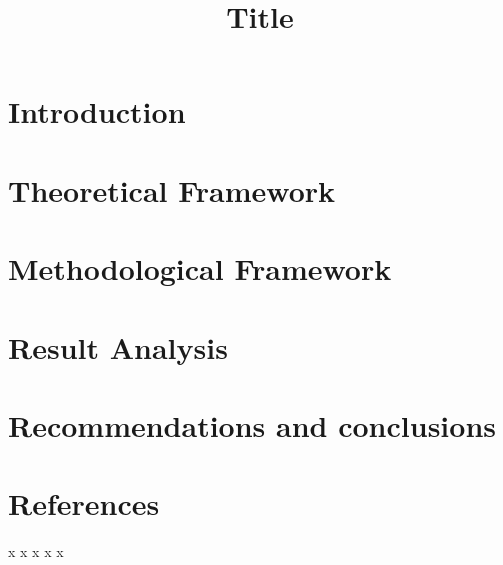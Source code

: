 \documentclass[conference]{IEEEtran}
\begin{document}
\title{Title}

\author{
}


\maketitle

\begin{abstract}
    
\end{abstract}

\begin{IEEEkeywords}
    
\end{IEEEkeywords}

\section{Introduction}

\section{Theoretical Framework}

\section{Methodological Framework}

\section{Result Analysis}

\section{Recommendations and conclusions}

\section{References}

\begin{thebibliography}{00}
     x
     x
     x
     x
     x
        \
\end{thebibliography}
    
\end{document}
